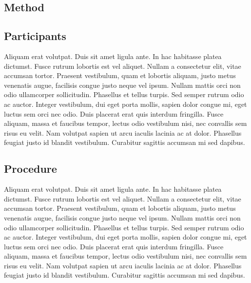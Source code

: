 \begin{refsection}
\vspace{-0.5em}


\vspace{-1em}

\section{Method}

\subsection{Participants}

\vspace{-0.5em}

Aliquam erat volutpat. Duis sit amet ligula ante. In hac habitasse platea dictumst. Fusce rutrum lobortis est vel aliquet. Nullam a consectetur elit, vitae accumsan tortor. Praesent vestibulum, quam et lobortis aliquam, justo metus venenatis augue, facilisis congue justo neque vel ipsum. Nullam mattis orci non odio ullamcorper sollicitudin. Phasellus et tellus turpis. Sed semper rutrum odio ac auctor. Integer vestibulum, dui eget porta mollis, sapien dolor congue mi, eget luctus sem orci nec odio. Duis placerat erat quis interdum fringilla. Fusce aliquam, massa et faucibus tempor, lectus odio vestibulum nisi, nec convallis sem risus eu velit. Nam volutpat sapien ut arcu iaculis lacinia ac at dolor. Phasellus feugiat justo id blandit vestibulum. Curabitur sagittis accumsan mi sed dapibus.

\subsection{Procedure}

\vspace{-0.5em}

Aliquam erat volutpat. Duis sit amet ligula ante. In hac habitasse platea dictumst. Fusce rutrum lobortis est vel aliquet. Nullam a consectetur elit, vitae accumsan tortor. Praesent vestibulum, quam et lobortis aliquam, justo metus venenatis augue, facilisis congue justo neque vel ipsum. Nullam mattis orci non odio ullamcorper sollicitudin. Phasellus et tellus turpis. Sed semper rutrum odio ac auctor. Integer vestibulum, dui eget porta mollis, sapien dolor congue mi, eget luctus sem orci nec odio. Duis placerat erat quis interdum fringilla. Fusce aliquam, massa et faucibus tempor, lectus odio vestibulum nisi, nec convallis sem risus eu velit. Nam volutpat sapien ut arcu iaculis lacinia ac at dolor. Phasellus feugiat justo id blandit vestibulum. Curabitur sagittis accumsan mi sed dapibus.


\end{refsection}
